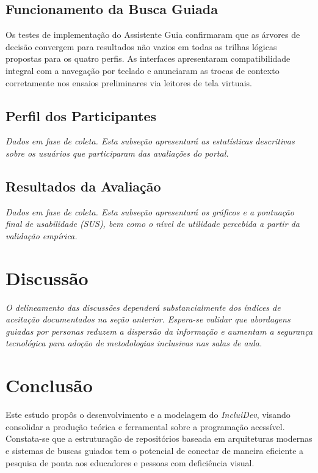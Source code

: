 \documentclass[12pt, a4paper, oneside]{article}
\begin{document}
\subsection{Funcionamento da Busca Guiada}
Os testes de implementação do Assistente Guia confirmaram que as árvores de decisão convergem para resultados não vazios em todas as trilhas lógicas propostas para os quatro perfis. As interfaces apresentaram compatibilidade integral com a navegação por teclado e anunciaram as trocas de contexto corretamente nos ensaios preliminares via leitores de tela virtuais.

\subsection{Perfil dos Participantes}
\textit{Dados em fase de coleta. Esta subseção apresentará as estatísticas descritivas sobre os usuários que participaram das avaliações do portal.}

\subsection{Resultados da Avaliação}
\textit{Dados em fase de coleta. Esta subseção apresentará os gráficos e a pontuação final de usabilidade (SUS), bem como o nível de utilidade percebida a partir da validação empírica.}

\section{Discussão}
\textit{O delineamento das discussões dependerá substancialmente dos índices de aceitação documentados na seção anterior. Espera-se validar que abordagens guiadas por personas reduzem a dispersão da informação e aumentam a segurança tecnológica para adoção de metodologias inclusivas nas salas de aula.}

\section{Conclusão}
Este estudo propôs o desenvolvimento e a modelagem do \textit{IncluiDev}, visando consolidar a produção teórica e ferramental sobre a programação acessível. Constata-se que a estruturação de repositórios baseada em arquiteturas modernas e sistemas de buscas guiados tem o potencial de conectar de maneira eficiente a pesquisa de ponta aos educadores e pessoas com deficiência visual. 
\end{document}
